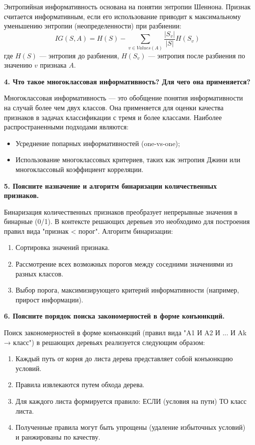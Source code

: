 Энтропийная информативность основана на понятии энтропии Шеннона. Признак считается информативным, если его использование приводит к максимальному уменьшению энтропии (неопределенности) при разбиении:
\[
IG(S, A) = H(S) - \sum_{v \in Values(A)} \frac{|S_v|}{|S|} H(S_v)
\]
где \(H(S)\) — энтропия до разбиения, \(H(S_v)\) — энтропия после разбиения по значению \(v\) признака \(A\).

\textbf{4. Что такое многоклассовая информативность? Для чего она применяется?}

Многоклассовая информативность — это обобщение понятия информативности на случай более чем двух классов. Она применяется для оценки качества признаков в задачах классификации с тремя и более классами. Наиболее распространенными подходами являются:
\begin{itemize}
    \item Усреднение попарных информативностей (one-vs-one);
    \item Использование многоклассовых критериев, таких как энтропия Джини или многоклассовый коэффициент корреляции.
\end{itemize}

\textbf{5. Поясните назначение и алгоритм бинаризации количественных признаков.}

Бинаризация количественных признаков преобразует непрерывные значения в бинарные (0/1). В контексте решающих деревьев это необходимо для построения правил вида "признак < порог". Алгоритм бинаризации:
\begin{enumerate}
    \item Сортировка значений признака.
    \item Рассмотрение всех возможных порогов между соседними значениями из разных классов.
    \item Выбор порога, максимизирующего критерий информативности (например, прирост информации).
\end{enumerate}

\textbf{6. Поясните порядок поиска закономерностей в форме конъюнкций.}

Поиск закономерностей в форме конъюнкций (правил вида "A1 И A2 И ... И Ak → класс") в решающих деревьях реализуется следующим образом:
\begin{enumerate}
    \item Каждый путь от корня до листа дерева представляет собой конъюнкцию условий.
    \item Правила извлекаются путем обхода дерева.
    \item Для каждого листа формируется правило: ЕСЛИ (условия на пути) ТО класс листа.
    \item Полученные правила могут быть упрощены (удаление избыточных условий) и ранжированы по качеству.
\end{enumerate}


